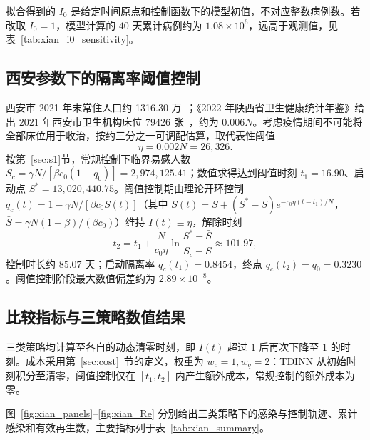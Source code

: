\documentclass[lang=cn,a4paper,newtx]{elegantpaper}
\numberwithin{equation}{section}
\theoremstyle{plain}
\begin{document}
拟合得到的 $I_0$ 是给定时间原点和控制函数下的模型初值，不对应整数病例数。若改取 $I_0=1$，模型计算的 $40$ 天累计病例约为 $1.08\times10^6$，远高于观测值，见表~\ref{tab:xian_i0_sensitivity}。

\begin{table}[htbp]
    \centering
    \caption{固定参数后的初始条件估计。}
    \label{tab:xian_initial_fit}
    
\end{table}

\begin{table}[htbp]
    \centering
    \caption{不同初值设定下的模型输出。}
    \label{tab:xian_i0_sensitivity}
    {}
\end{table}

\subsection{西安参数下的隔离率阈值控制}
西安市 2021 年末常住人口约 1316.30 万~\cite{XianStat2021}；《2022 年陕西省卫生健康统计年鉴》给出 2021 年西安市卫生机构床位 79426 张~\cite{ShaanxiHealth2022}，约为 $0.006N$。考虑疫情期间不可能将全部床位用于收治，按约三分之一可调配估算，取代表性阈值
\begin{equation}
\eta=0.002N=26{,}326.
\end{equation}
按第~\ref{sec:s1}节，常规控制下临界易感人数 $S_c=\gamma N/[\beta c_0(1-q_0)]=2{,}974{,}125.41$；数值求得达到阈值时刻 $t_1=16.90$、启动点 $S^*=13{,}020{,}440.75$。阈值控制期由理论开环控制 $q_c(t)=1-\gamma N/[\beta c_0 S(t)]$（其中 $S(t)=\bar S+(S^*-\bar S)e^{-c_0\eta(t-t_1)/N}$，$\bar S=\gamma N(1-\beta)/(\beta c_0)$）维持 $I(t)\equiv\eta$，解除时刻
\[
t_2=t_1+\frac{N}{c_0\eta}\ln\frac{S^*-\bar S}{S_c-\bar S}\approx101.97,
\]
控制时长约 $85.07$ 天；启动隔离率 $q_c(t_1)=0.8454$，终点 $q_c(t_2)=q_0=0.3230$。阈值控制阶段最大数值偏差约为 $2.89\times10^{-8}$。

\subsection{比较指标与三策略数值结果}
三类策略均计算至各自的动态清零时刻，即 $I(t)$ 超过 $1$ 后再次下降至 $1$ 的时刻。成本采用第~\ref{sec:cost}~节的定义，权重为 $w_c=1,w_q=2$：TDINN 从初始时刻积分至清零，阈值控制仅在 $[t_1,t_2]$ 内产生额外成本，常规控制的额外成本为零。

图~\ref{fig:xian_panels}--\ref{fig:xian_Re} 分别给出三类策略下的感染与控制轨迹、累计感染和有效再生数，主要指标列于表~\ref{tab:xian_summary}。
\end{document}
